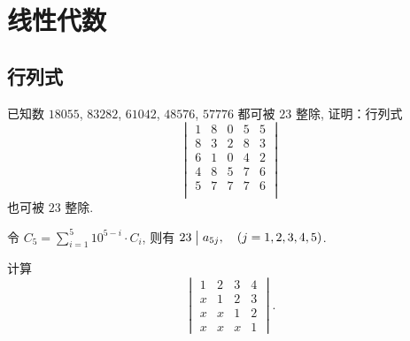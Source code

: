\section{线性代数}

\subsection{行列式}
\begin{exercise}
	已知数 $18055$, $83282$, $61042$, $48576$, $57776$ 都可被 $23$ 整除, 证明：行列式
	\[\begin{vmatrix}
	1 & 8 & 0 & 5 & 5 \\
	8 & 3 & 2 & 8 & 3 \\
	6 & 1 & 0 & 4 & 2 \\
	4 & 8 & 5 & 7 & 6 \\
	5 & 7 & 7 & 7 & 6 \\
	\end{vmatrix}\]
	也可被 $23$ 整除.
\end{exercise}

\begin{proofs}
	令 $\displaystyle C_5=\sum_{i=1}^{5}10^{5-i}\cdot C_i$, 则有 $\displaystyle 23\bigm| a_{5j},\quad (j=1,2,3,4,5)$.
\end{proofs}

\begin{exercise} \label{ex:vec:123x}
    计算
    \[
    \begin{vmatrix}
    1 & 2 & 3 & 4 \\
    x & 1 & 2 & 3 \\
    x & x & 1 & 2 \\
    x & x & x & 1
    \end{vmatrix}.
    \]
\end{exercise}

